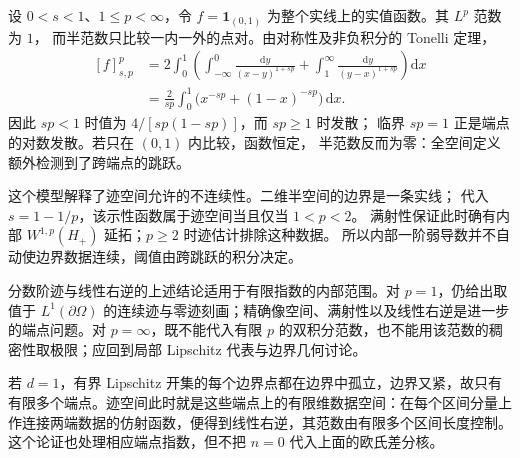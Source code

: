 \begin{proposition}[一个边界跳跃的分数阶代价]\label{b1:eg:interval-fractional-jump}
设 \(0<s<1\)、\(1\le p<\infty\)，令 \(f=\mathbf1_{(0,1)}\) 为整个实线上的实值函数。其 \(L^p\) 范数为 \(1\)，
而半范数只比较一内一外的点对。由对称性及非负积分的 Tonelli 定理，
\[
 \begin{aligned}
 [f]_{s,p}^p
 &=2\int_0^1\left(\int_{-\infty}^0\frac{\mathrm dy}{(x-y)^{1+sp}}
                  +\int_1^\infty\frac{\mathrm dy}{(y-x)^{1+sp}}\right)\mathrm dx\\
 &=\frac2{sp}\int_0^1\bigl(x^{-sp}+(1-x)^{-sp}\bigr)\,\mathrm dx.
 \end{aligned}
\]
因此 \(sp<1\) 时值为 \(4/[sp(1-sp)]\)，而 \(sp\ge1\) 时发散；
临界 \(sp=1\) 正是端点的对数发散。若只在 \((0,1)\) 内比较，函数恒定，
半范数反而为零：全空间定义额外检测到了跨端点的跳跃。
\end{proposition}

这个模型解释了迹空间允许的不连续性。二维半空间的边界是一条实线；
代入 \(s=1-1/p\)，该示性函数属于迹空间当且仅当 \(1<p<2\)。
满射性保证此时确有内部 \(W^{1,p}(H_+)\) 延拓；\(p\ge2\) 时迹估计排除这种数据。
所以内部一阶弱导数并不自动使边界数据连续，阈值由跨跳跃的积分决定。

\ProseParagraphBreak

分数阶迹与线性右逆的上述结论适用于有限指数的内部范围。对 \(p=1\)，仍给出取值于 \(L^1(\partial\Omega)\) 的连续迹与零迹刻画；精确像空间、满射性以及线性右逆是进一步的端点问题。对 \(p=\infty\)，既不能代入有限 \(p\) 的双积分范数，也不能用该范数的稠密性取极限；应回到局部 Lipschitz 代表与边界几何讨论。

\ProseParagraphBreak

若 \(d=1\)，有界 Lipschitz 开集的每个边界点都在边界中孤立，边界又紧，故只有有限多个端点。迹空间此时就是这些端点上的有限维数据空间：在每个区间分量上作连接两端数据的仿射函数，便得到线性右逆，其范数由有限多个区间长度控制。这个论证也处理相应端点指数，但不把 \(n=0\) 代入上面的欧氏差分核。
